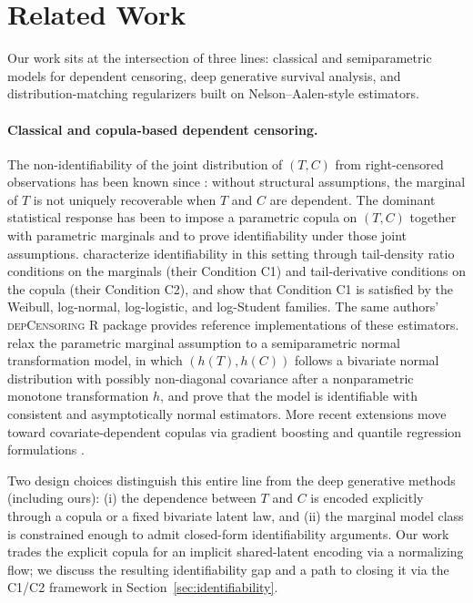 \section{Related Work}
\label{sec:related}

Our work sits at the intersection of three lines: classical and semiparametric
models for dependent censoring, deep generative survival analysis, and
distribution-matching regularizers built on Nelson--Aalen-style estimators.

\paragraph{Classical and copula-based dependent censoring.}
The non-identifiability of the joint distribution of $(T, C)$ from right-censored
observations has been known since \citet{tsiatis1975nonidentifiability}: without
structural assumptions, the marginal of $T$ is not uniquely recoverable when
$T$ and $C$ are dependent. The dominant statistical response has been to
impose a parametric copula on $(T, C)$ together with parametric marginals and
to prove identifiability under those joint assumptions. \citet{czado2023dependent}
characterize identifiability in this setting through tail-density ratio conditions
on the marginals (their Condition C1) and tail-derivative conditions on the
copula (their Condition C2), and show that Condition C1 is satisfied by the
Weibull, log-normal, log-logistic, and log-Student families. The same authors'
\textsc{depCensoring} R package provides reference implementations of these
estimators. \citet{deresa2021semiparametric} relax the parametric marginal
assumption to a semiparametric normal transformation model, in which $(h(T), h(C))$
follows a bivariate normal distribution with possibly non-diagonal covariance
after a nonparametric monotone transformation $h$, and prove that the model
is identifiable with consistent and asymptotically normal estimators. More
recent extensions move toward covariate-dependent copulas via gradient boosting
\citep{verstraete2025boosting} and quantile regression formulations
\citep{debacker2025quantile}.

Two design choices distinguish this entire line from the deep generative
methods (including ours): (i) the dependence between $T$ and $C$ is encoded
explicitly through a copula or a fixed bivariate latent law, and (ii) the
marginal model class is constrained enough to admit closed-form identifiability
arguments. Our work trades the explicit copula for an implicit
shared-latent encoding via a normalizing flow; we discuss the resulting
identifiability gap and a path to closing it via the C1/C2 framework in
Section~\ref{sec:identifiability}.

